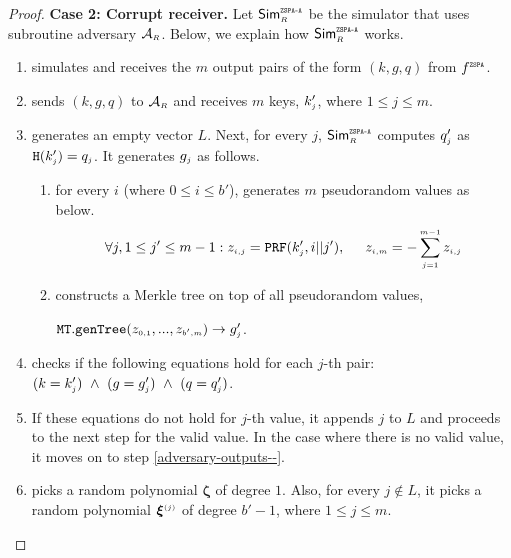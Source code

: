\begin{proof}
\noindent\textbf{Case 2: Corrupt receiver.}   Let $\mathsf{Sim}^{\scriptscriptstyle \mathtt{ZSPA\text{-}A}}_{\scriptscriptstyle R}$ be the simulator that uses subroutine adversary $\mathcal{A}_{\scriptscriptstyle R}$. Below, we explain how $\mathsf{Sim}^{\scriptscriptstyle \mathtt{ZSPA\text{-}A}}_{\scriptscriptstyle R}$ works. 




\begin{enumerate}
%
\item simulates  \zspa and receives the $m$ output pairs of the form $( k,  g,  q) $ from $f^{\scriptscriptstyle \mathtt{ZSPA}}$.
%
\item sends $( k,  g,  q) $ to $\mathcal{A}_{\scriptscriptstyle R}$ and receives $m$ keys, $ k'_{\scriptscriptstyle j}$, where $1\leq j \leq m$. 
%
\item\label{ZSPA-A-Case-2-generate-z} generates an empty vector $ L$. Next, for every $j$, $\mathsf{Sim}^{\scriptscriptstyle \mathtt{ZSPA\text{-}A}}_{\scriptscriptstyle R}$ computes $q'_{\scriptscriptstyle j}$ as $\mathtt {H}( k'_{\scriptscriptstyle j})=q_{\scriptscriptstyle j}$.  It generates $g_{\scriptscriptstyle j}$ as follows. 


\begin{enumerate}

\item\label{gen-pr-vals} for every $i$ (where $0\leq i \leq b'$), generates $m$ pseudorandom values as below. 
%
 $$\forall j, 1\leq j' \leq m-1: z_{\scriptscriptstyle i,j}=\mathtt{PRF}( k'_{\scriptscriptstyle j},i||j'), \hspace{5mm} z_{\scriptscriptstyle i,m}=-\sum\limits^{\scriptscriptstyle m-1}_{\scriptscriptstyle j=1}z_{\scriptscriptstyle i,j}$$
%
\item   constructs a Merkle tree on top of all pseudorandom values,  

$\mathtt{MT.genTree}(z_{\scriptscriptstyle 0,1},...,z_{\scriptscriptstyle b', m})\rightarrow  g'_{\scriptscriptstyle j}$. 
%
\end{enumerate}
%
\item checks if the following equations hold for each $j$-th pair: 
%
$( k=    k'_{\scriptscriptstyle j}) \ \wedge\  ( g=   g'_{\scriptscriptstyle j})  \ \wedge\ ( q=  q'_{\scriptscriptstyle j})$.
%
%
\item If these equations do not hold for $j$-th value, it appends $j$ to $ L$ and proceeds to the next step for the valid value. In the case where there is no valid value, it moves on to step \ref{adversary-outputs--}. 


\item picks a random polynomial ${\bm \zeta}$ of degree $1$. Also, for every $j\notin  L$, it picks a random polynomial ${\bm\xi}^{\scriptscriptstyle (j)}$ of degree $b'-1$, where $1\leq j \leq m$. 
%


\end{enumerate}
\end{proof}
